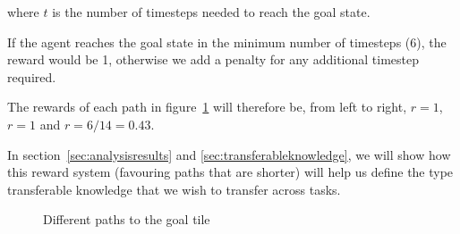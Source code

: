where $t$ is the number of timesteps needed to reach the goal state.

If the agent reaches the goal state in the minimum number of timesteps (6), the reward would be 1, otherwise we add a penalty for any additional timestep required.

The rewards of each path in figure~\ref{fig:FrozenLakePaths} will therefore be, from left to right, $r=1$, $r=1$ and $r=6/14=0.43$.

In section~\ref{sec:analysisresults} and \ref{sec:transferableknowledge}, we will show how this reward system (favouring paths that are shorter) will help us define the type transferable knowledge that we wish to transfer across tasks.

\begin{figure}[h]
\vskip 2mm
\caption{Different paths to the  goal tile}
\label{fig:FrozenLakePaths}
\vskip -2mm
\end{figure}


%
%
